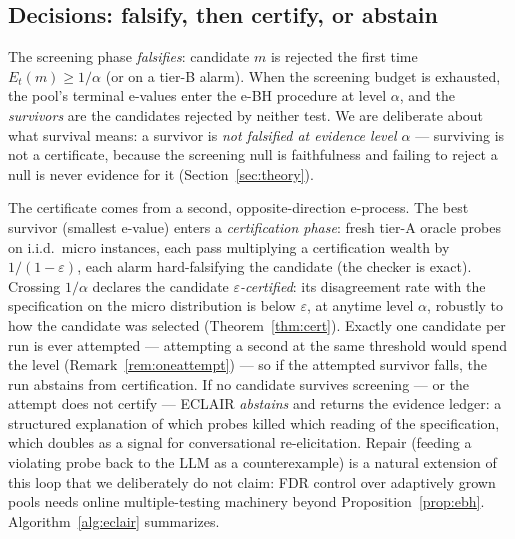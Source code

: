 \documentclass[pdflatex,sn-mathphys-num]{sn-jnl}
\theoremstyle{thmstyleone}
\theoremstyle{thmstyletwo}
\newcommand{\Eproc}{E}
\begin{document}
\subsection{Decisions: falsify, then certify, or
abstain}\label{sec:decisions}

The screening phase \emph{falsifies}: candidate $m$ is rejected the
first time $\Eproc_t(m) \ge 1/\alpha$ (or on a tier-B alarm). When
the screening budget is exhausted, the pool's terminal e-values enter
the e-BH procedure \cite{wang2022false} at level $\alpha$, and the
\emph{survivors} are the candidates rejected by neither test. We are
deliberate about what survival means: a survivor is \emph{not
falsified at evidence level $\alpha$} --- surviving is not a
certificate, because the screening null is faithfulness and failing
to reject a null is never evidence for it
(Section~\ref{sec:theory}).

The certificate comes from a second, opposite-direction e-process.
The best survivor (smallest e-value) enters a \emph{certification
phase}: fresh tier-A oracle probes on i.i.d.\ micro instances, each
pass multiplying a certification wealth by $1/(1-\varepsilon)$, each
alarm hard-falsifying the candidate (the checker is exact). Crossing
$1/\alpha$ declares the candidate \emph{$\varepsilon$-certified}:
its disagreement rate with the specification on the micro
distribution is below $\varepsilon$, at anytime level $\alpha$,
robustly to how the candidate was selected
(Theorem~\ref{thm:cert}). Exactly one candidate per run is ever
attempted --- attempting a second at the same threshold would spend
the level (Remark~\ref{rem:oneattempt}) --- so if the attempted
survivor falls, the run abstains from certification. If no
candidate survives screening --- or the attempt does not certify ---
ECLAIR \emph{abstains} and returns the evidence ledger: a structured
explanation of which probes killed which reading of the
specification, which doubles as a signal for conversational
re-elicitation. Repair (feeding a violating probe back to the LLM as
a counterexample) is a natural extension of this loop that we
deliberately do not claim: FDR control over adaptively grown pools
needs online multiple-testing machinery beyond
Proposition~\ref{prop:ebh}. Algorithm~\ref{alg:eclair} summarizes.
\end{document}
